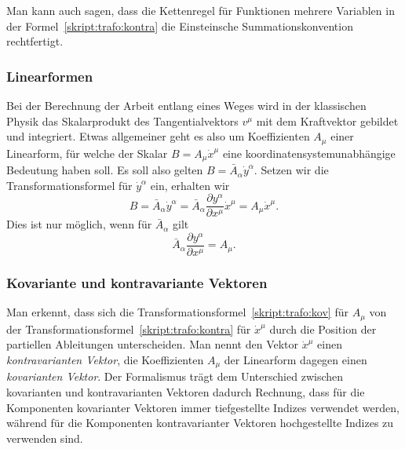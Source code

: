 Man kann auch sagen, dass die Kettenregel für Funktionen mehrere Variablen
in der Formel~\eqref{skript:trafo:kontra}
die Einsteinsche Summationskonvention rechtfertigt.

\subsubsection{Linearformen}
Bei der Berechnung der Arbeit entlang eines Weges wird in der klassischen
Physik das Skalarprodukt des Tangentialvektors $v^\mu$ mit dem Kraftvektor
gebildet und integriert.
Etwas allgemeiner geht es also um Koeffizienten $A_\mu$ einer Linearform,
für welche der Skalar $B=A_\mu\dot x^\mu$ eine koordinatensystemunabhängige
Bedeutung haben soll.
%
Es soll also gelten
$B=\bar A_\alpha \dot y^\alpha$.
Setzen wir die Transformationsformel für $\dot y^\alpha$ ein, erhalten
wir
\begin{equation}
B=\bar A_\alpha\dot y^\alpha
=
\bar A_\alpha \frac{\partial y^\alpha}{\partial x^\mu}\dot x^\mu
=
A_\mu\dot x^\mu.
\end{equation}
Dies ist nur möglich, wenn für $\bar A_\alpha$ gilt
\begin{equation}
\bar A_\alpha \frac{\partial y^\alpha}{\partial x^\mu}
= 
A_\mu.
\label{skript:trafo:kov}
\end{equation}

\subsubsection{Kovariante und kontravariante Vektoren}
Man erkennt, dass sich die Transformationsformel~\eqref{skript:trafo:kov}
für $A_\mu$ von der Transformationsformel~\eqref{skript:trafo:kontra}
für $\dot x^\mu$ durch die Position der partiellen Ableitungen unterscheiden.
Man nennt den Vektor $\dot x^\mu$ einen {\em kontravarianten Vektor},
%
%
die Koeffizienten $A_\mu$ der Linearform dagegen einen {\em kovarianten Vektor}.
%
%
Der Formalismus trägt dem Unterschied zwischen kovarianten und kontravarianten
Vektoren dadurch Rechnung, dass für die Komponenten kovarianter Vektoren
immer tiefgestellte Indizes verwendet werden, während für die Komponenten
kontravarianter Vektoren hochgestellte Indizes zu verwenden sind.

